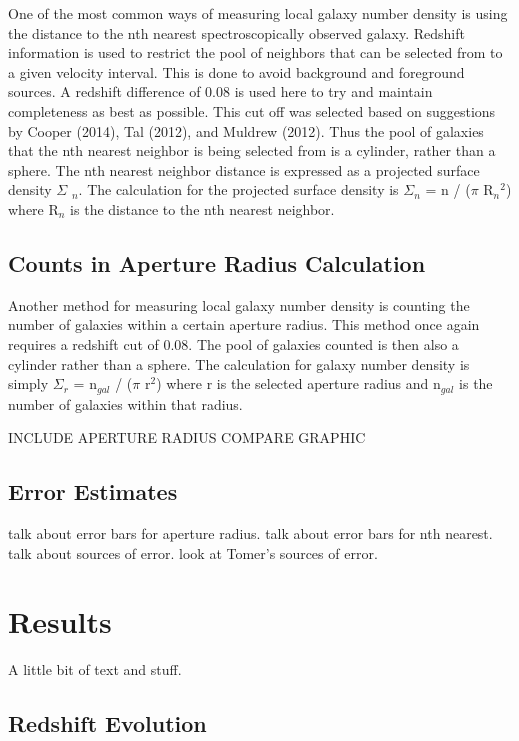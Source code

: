 \documentclass[apj]{emulateapj}
\begin{document}
One of the most common ways of measuring local galaxy number density is using the distance to the nth nearest spectroscopically observed galaxy. Redshift information is used to restrict the pool of neighbors that can be selected from to a given velocity interval. This is done to avoid background and foreground sources. A redshift difference of 0.08 is used here to try and maintain completeness as best as possible. This cut off was selected based on suggestions by Cooper (2014), Tal (2012), and Muldrew (2012). Thus the pool of galaxies that the nth nearest neighbor is being selected from is a cylinder, rather than a sphere. The nth nearest neighbor distance is expressed as a projected surface density $\Sigma$ $_{n}$. The calculation for the projected surface density is $\Sigma$$_{n}$ = n / ($\pi$ R$_{n}$$^{2}$) where R$_{n}$ is the distance to the nth nearest neighbor. 



\subsection{Counts in Aperture Radius Calculation}

Another method for measuring local galaxy number density is counting the number of galaxies within a certain aperture radius. This method once again requires a redshift cut of 0.08. The pool of galaxies counted is then also a cylinder rather than a sphere. The calculation for galaxy number density is simply $\Sigma$$_{r}$ = n$_{gal}$ / ($\pi$ r$^{2}$) where r is the selected aperture radius and n$_{gal}$ is the number of galaxies within that radius.

INCLUDE APERTURE RADIUS COMPARE GRAPHIC

\subsection{Error Estimates}

talk about error bars for aperture radius. talk about error bars for nth nearest. talk about sources of error. look at Tomer's sources of error.

\section{Results}

A little bit of text and stuff.

\subsection{Redshift Evolution}
\end{document}
